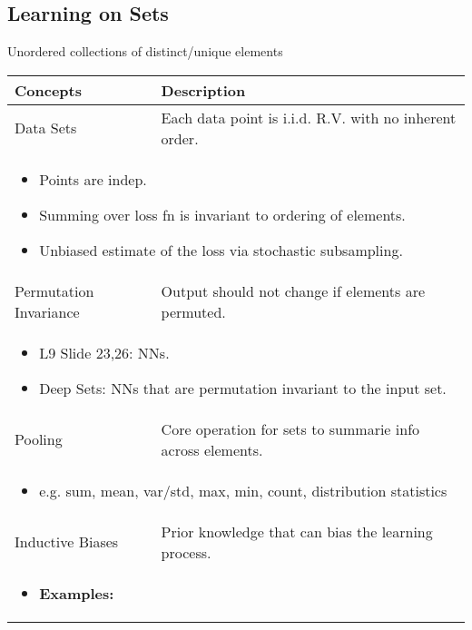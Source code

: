\subsection{Learning on Sets}
\begin{summary}
    Unordered collections of distinct/unique elements 
    \begin{center}
        \begin{tabular}{ll}
            \toprule
            \textbf{Concepts} & \textbf{Description} \\
            \toprule
            Data Sets & Each data point is i.i.d. R.V. with no inherent order. \\
            \midrule
            \multicolumn{2}{p{\linewidth}}{
            \begin{itemize}
                \item Points are indep. 
                \item Summing over loss fn is invariant to ordering of elements.
                \item Unbiased estimate of the loss via stochastic subsampling.
            \end{itemize}} \\
            \midrule
            Permutation Invariance & Output should not change if elements are permuted. \\
            \multicolumn{2}{p{\linewidth}}{
            \begin{itemize}
                \item L9 Slide 23,26: NNs.
                \item Deep Sets: NNs that are permutation invariant to the input set.
            \end{itemize}} \\
            \midrule
            Pooling & Core operation for sets to summarie info across elements. \\
            \multicolumn{2}{p{\linewidth}}{
            \begin{itemize}
                \item e.g. sum, mean, var/std, max, min, count, distribution statistics
            \end{itemize}} \\
            \midrule
            Inductive Biases & Prior knowledge that can bias the learning process. \\
            \multicolumn{2}{p{\linewidth}}{
                \begin{itemize}
                    \item \textbf{Examples:}

\end{itemize}}
\end{tabular}
\end{center}
\end{summary}
